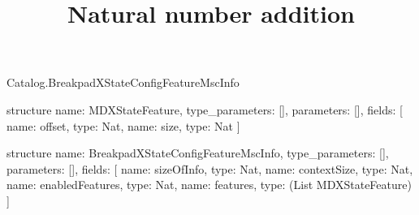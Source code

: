 \begin{lexlean}{Catalog.BreakpadXStateConfigFeatureMscInfo}
\title{Natural number addition}
\begin{semanticmodule}
structure{
  name: MDXStateFeature,
  type_parameters: [],
  parameters: [],
  fields: [
    {name: offset, type: Nat},
    {name: size, type: Nat}
  ]
}

structure{
  name: BreakpadXStateConfigFeatureMscInfo,
  type_parameters: [],
  parameters: [],
  fields: [
    {name: sizeOfInfo, type: Nat},
    {name: contextSize, type: Nat},
    {name: enabledFeatures, type: Nat},
    {name: features, type: (List MDXStateFeature)}
  ]
}
\end{semanticmodule}
\end{lexlean}

